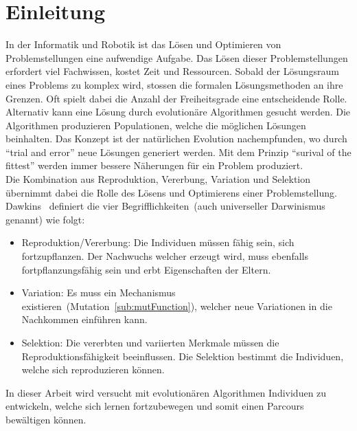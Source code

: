 %
%


\chapter{Einleitung}

  In der Informatik und Robotik ist das Lösen und Optimieren von Problemstellungen eine aufwendige Aufgabe.
  Das Lösen dieser Problemstellungen erfordert viel Fachwissen, kostet Zeit und Ressourcen.
  Sobald der Lösungsraum eines Problems zu komplex wird, stossen die formalen Lösungsmethoden an ihre Grenzen.
  Oft spielt dabei die Anzahl der Freiheitsgrade eine entscheidende Rolle.
  \\
  Alternativ kann eine Lösung durch evolutionäre Algorithmen gesucht werden.
  Die Algorithmen produzieren Populationen, welche die möglichen Lösungen beinhalten.
  Das Konzept ist der natürlichen Evolution nachempfunden, wo durch ``trial and error'' neue Lösungen generiert werden.
  Mit dem Prinzip ``surival of the fittest'' werden immer bessere Näherungen für ein Problem produziert.
  \\
  Die Kombination aus Reproduktion, Vererbung, Variation und Selektion
  übernimmt dabei die Rolle des Lösens und Optimierens einer Problemstellung.
  \\
  Dawkins~\cite{book:universalDarwinism} definiert die vier Begrifflichkeiten~(auch universeller Darwinismus genannt) wie folgt:

  \begin{itemize}

    \item Reproduktion/Vererbung: Die Individuen müssen fähig sein, sich fortzupflanzen.
      Der Nachwuchs welcher erzeugt wird, muss ebenfalls fortpflanzungsfähig sein und erbt Eigenschaften der Eltern.

    \item Variation: Es muss ein Mechanismus existieren~(Mutation~\vref{sub:mutFunction}),
      welcher neue Variationen in die Nachkommen einführen kann.

    \item Selektion: Die vererbten und variierten Merkmale müssen die Reproduktionsfähigkeit beeinflussen.
      Die Selektion bestimmt die Individuen, welche sich reproduzieren können.

  \end{itemize}

  In dieser Arbeit wird versucht mit evolutionären Algorithmen Individuen zu entwickeln,
  welche sich lernen fortzubewegen und somit einen Parcours bewältigen können.

